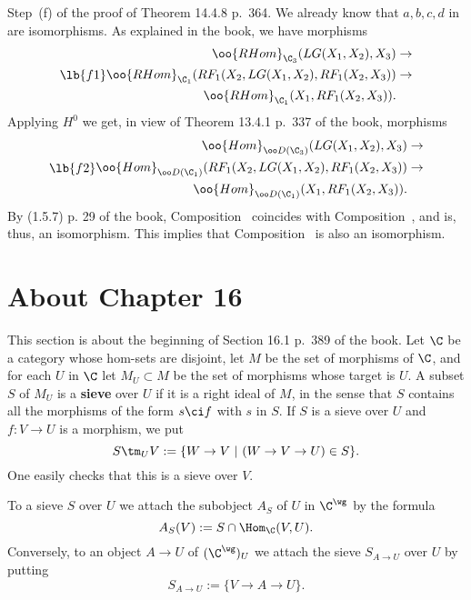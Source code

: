 \documentclass[12pt]{article}
\theoremstyle{remark}
\theoremstyle{definition}
\begin{document}
\begin{s}
Step~(f) of the proof of Theorem 14.4.8 p.~364. We already know that $a,b,c,d$ in  are isomorphisms. As explained in the book, we have morphisms  
\begin{equation}\lb{f1}
\begin{split}
\oo{RHom}_{\C_3}(LG(X_1,X_2),X_3)&\to\\ 
\oo{RHom}_{\C_1}(RF_1(X_2,LG(X_1,X_2),RF_1(X_2,X_3))&\to\\ 
\oo{RHom}_{\C_1}(X_1,RF_1(X_2,X_3)).
\end{split}
\end{equation}
Applying $H^0$ we get, in view of Theorem 13.4.1 p.~337 of the book, morphisms 
\begin{equation}\lb{f2}
\begin{split}
\oo{Hom}_{\oo D(\C_3)}(LG(X_1,X_2),X_3)&\to\\ 
\oo{Hom}_{\oo D(\C_1)}(RF_1(X_2,LG(X_1,X_2),RF_1(X_2,X_3))&\to\\ 
\oo{Hom}_{\oo D(\C_1)}(X_1,RF_1(X_2,X_3)).
\end{split}
\end{equation}
By (1.5.7) p. 29 of the book, Composition~ coincides with Composition~, and is, thus, an isomorphism. This implies that Composition~ is also an isomorphism.
\end{s}


\section{About Chapter 16}


This section is about the beginning of Section 16.1 p.~389 of the book. Let $\C$ be a category whose hom-sets are disjoint, let $M$ be the set of morphisms of $\C$, and for each $U$ in $\C$ let $M_U\subset M$ be the set of morphisms whose target is $U$. A subset $S$ of $M_U$ is a \textbf{sieve}  over $U$ if it is a right ideal of $M$, in the sense that $S$ contains all the morphisms of the form $s\ci f$ with $s$ in $S$. If $S$ is a sieve over $U$ and $f:V\to U$ is a morphism, we put
$$
S\tm_UV:=\{W\to V\ |\ (W\to V\to U)\in S\}.
$$
One easily checks that this is a sieve over $V$. 

To a sieve $S$ over $U$ we attach the subobject $A_S$ of $U$ in $\C^\wg$ by the formula
$$
A_S(V):=S\cap\Hom_\C(V,U).
$$ 
Conversely, to an object $A\to U$ of $(\C^\wg)_U$ we attach the sieve $S_{A\to U}$ over $U$ by putting 
$$
S_{A\to U}:=\{V\to A\to U\}.
$$ 
\end{document}
